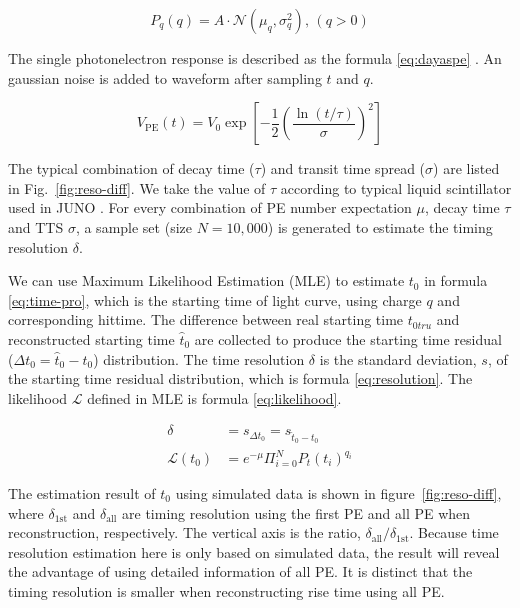 \begin{equation}
    P_{q}(q) = A\cdot\mathcal{N}(\mu_{q},\sigma_{q}^{2}),\,(q>0)
    \label{eq:truncated}
\end{equation}

The single photonelectron response is described as the formula \eqref{eq:dayaspe} \cite{jetter_pmt_2012}. An gaussian noise is added to waveform after sampling $t$ and $q$. 

\begin{equation}
    V_\mathrm{PE}(t) = V_{0}\exp\left[-\frac{1}{2}\left(\frac{\ln(t/\tau)}{\sigma}\right)^{2}\right]
    \label{eq:dayaspe}
\end{equation}

The typical combination of decay time ($\tau$) and transit time spread ($\sigma$) are listed in Fig.~\ref{fig:reso-diff}. We take the value of $\tau$ according to typical liquid scintillator used in JUNO \cite{ludhova_particle_2020}. For every combination of PE number expectation $\mu$, decay time $\tau$ and TTS $\sigma$, a sample set (size $N=10,000$) is generated to estimate the timing resolution $\delta$. 

We can use Maximum Likelihood Estimation (MLE) to estimate $t_{0}$ in formula \eqref{eq:time-pro}, which is the starting time of light curve, using charge $q$ and corresponding hittime. The difference between real starting time $t_{0tru}$ and reconstructed starting time $\hat{t}_0$ are collected to produce the starting time residual ($\Delta t_{0}=\hat{t}_0-t_0$) distribution. The time resolution $\delta$ is the standard deviation, $s$, of the starting time residual distribution, which is formula \eqref{eq:resolution}. The likelihood $\mathcal{L}$ defined in MLE is formula \eqref{eq:likelihood}. 

\begin{align}
  \delta &= s_{\Delta t_{0}} = s_{\hat{t}_0-t_0} \label{eq:resolution} \\
  \mathcal{L}(t_{0}) &= e^{-\mu}\Pi_{i=0}^{N}P_{t}(t_{i})^{q_{i}} \label{eq:likelihood}
\end{align}

The estimation result of $t_{0}$ using simulated data is shown in figure~\ref{fig:reso-diff}, where $\delta_{\mathrm{1st}}$ and $\delta_{\mathrm{all}}$ are timing resolution using the first PE and all PE when reconstruction, respectively. The vertical axis is the ratio, $\delta_{\mathrm{all}}/\delta_{\mathrm{1st}}$. Because time resolution estimation here is only based on simulated data, the result will reveal the advantage of using detailed information of all PE. It is distinct that the timing resolution is smaller when reconstructing rise time using all PE. 

